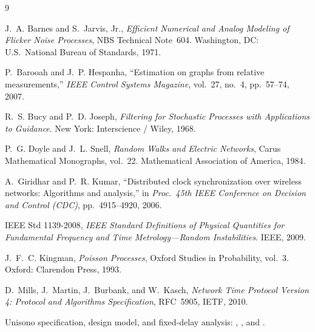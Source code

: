 \documentclass[11pt,a4paper]{article}
\theoremstyle{definition}
\begin{document}
\begin{thebibliography}{9}

J.~A. Barnes and S.~Jarvis, Jr.,
\emph{Efficient Numerical and Analog Modeling of Flicker Noise Processes},
NBS Technical Note~604.
Washington, DC: U.S.\ National Bureau of Standards, 1971.

P.~Barooah and J.~P. Hespanha,
``Estimation on graphs from relative measurements,''
\emph{IEEE Control Systems Magazine}, vol.~27, no.~4, pp.~57--74, 2007.

R.~S. Bucy and P.~D. Joseph,
\emph{Filtering for Stochastic Processes with Applications to Guidance}.
New York: Interscience / Wiley, 1968.

P.~G. Doyle and J.~L. Snell,
\emph{Random Walks and Electric Networks},
Carus Mathematical Monographs, vol.~22.
Mathematical Association of America, 1984.

A.~Giridhar and P.~R. Kumar,
``Distributed clock synchronization over wireless networks: Algorithms and analysis,''
in \emph{Proc.\ 45th IEEE Conference on Decision and Control (CDC)},
pp.~4915--4920, 2006.

IEEE Std 1139-2008,
\emph{IEEE Standard Definitions of Physical Quantities for Fundamental
Frequency and Time Metrology---Random Instabilities}.
IEEE, 2009.

J.~F.~C. Kingman,
\emph{Poisson Processes},
Oxford Studies in Probability, vol.~3.
Oxford: Clarendon Press, 1993.

D.~Mills, J.~Martin, J.~Burbank, and W.~Kasch,
\emph{Network Time Protocol Version 4: Protocol and Algorithms Specification},
RFC~5905, IETF, 2010.

Unisono specification, design model, and fixed-delay analysis:
, , and
.

\end{thebibliography}
\end{document}
